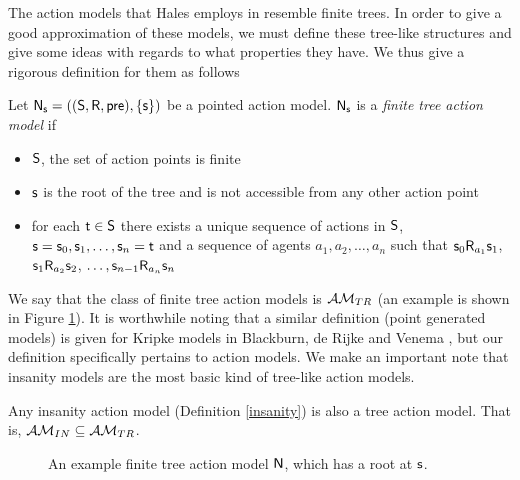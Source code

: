 The action models that Hales employs in \cite{hales13synthesis} resemble finite trees.
In order to give a good approximation of these models, we must define these tree-like structures and
give some ideas with regards to what properties they have.
We thus give a rigorous definition for them as follows

\begin{defn} \label{finTree}
Let $\mathrm{\mathsf{N}}_\mathrm{\mathsf{s}} = ((\mathrm{\mathsf{S}}, \mathrm{\mathsf{R}}, \mathrm{\mathsf{pre}}), \{\mathrm{\mathsf{s}}\})$ be a pointed action model.
$\mathrm{\mathsf{N}}_\mathrm{\mathsf{s}}$ is a {\em finite tree action model} if
\begin{itemize}
	\item $\mathrm{\mathsf{S}}$, the set of action points is finite
	\item $\mathrm{\mathsf{s}}$ is the root of the tree and is not accessible from any other action point
	\item for each $\mathrm{\mathsf{t}} \in \mathrm{\mathsf{S}}$ there exists a unique sequence of actions in $\mathrm{\mathsf{S}}$, $\mathrm{\mathsf{s}} = \mathrm{\mathsf{s}}_0,
	\mathrm{\mathsf{s}}_1, \ldots, \mathrm{\mathsf{s}}_n = \mathrm{\mathsf{t}}$ and a sequence of agents $a_1, a_2, \ldots, a_n$ such that $\mathrm{\mathsf{s}}_0
	\mathrm{\mathsf{R}}_{a_1}
	\mathrm{\mathsf{s}}_1$, $\mathrm{\mathsf{s}}_1 \mathrm{\mathsf{R}}_{a_2} \mathrm{\mathsf{s}}_2$, $\ldots, \mathrm{\mathsf{s}}_{n-1} \mathrm{\mathsf{R}}_{a_n} \mathrm{\mathsf{s}}_n$
\end{itemize}
\end{defn}

We say that the class of finite tree action models is $\mathcal{AM}_{TR}$ (an example is shown in Figure
\ref{figure:exampleTree}).
It is worthwhile noting that a similar definition (point generated models) is given for Kripke models in Blackburn, de Rijke
and Venema \cite{blackburn2002modal}, but our definition specifically pertains to action models.
We make an important note that insanity models are the most basic kind of tree-like action models.

\begin{lemma} \label{insaneIsTree}
	Any insanity action model (Definition \ref{insanity}) is also a tree action model.
	That is, $\mathcal{AM}_{IN} \subseteq \mathcal{AM}_{TR}$.
\end{lemma}

\begin{figure}
\centering
{}
\caption[Example tree]{An example finite tree action model $\mathrm{\mathsf{N}}$, which has a root at $\mathrm{\mathsf{s}}$.}
\label{figure:exampleTree}
\end{figure}

